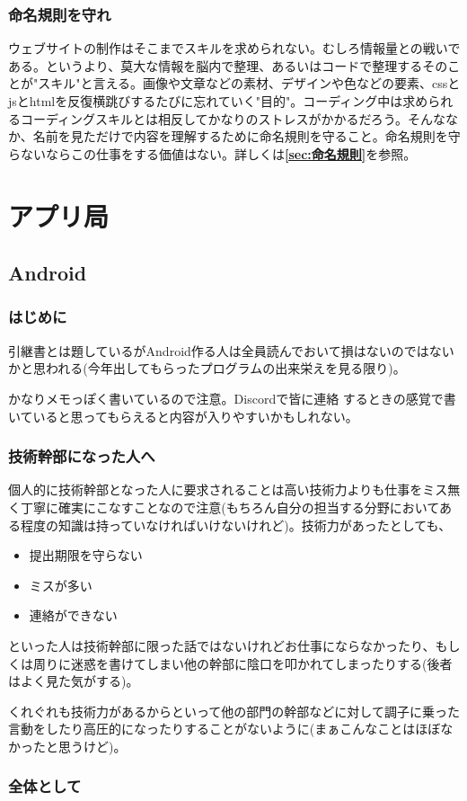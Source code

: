 \documentclass[a4paper]{ltjsreport}
\newcommand{\Chapter}[1]{\chapter{#1}\thispagestyle{fancy}}
\begin{document}
\subsection{命名規則を守れ}
ウェブサイトの制作はそこまでスキルを求められない。むしろ情報量との戦いである。というより、莫大な情報を脳内で整理、あるいはコードで整理するそのことが"スキル"と言える。画像や文章などの素材、デザインや色などの要素、cssとjsとhtmlを反復横跳びするたびに忘れていく"目的"。コーディング中は求められるコーディングスキルとは相反してかなりのストレスがかかるだろう。そんななか、名前を見ただけで内容を理解するために命名規則を守ること。命名規則を守らないならこの仕事をする価値はない。詳しくは{\bfseries\ref{sec:命名規則}}を参照。

\Chapter{アプリ局}
\section{Android}
\subsection{はじめに}
引継書とは題しているがAndroid作る人は全員読んでおいて損はないのではないかと思われる(今年出してもらったプログラムの出来栄えを見る限り)。\par
かなりメモっぽく書いているので注意。Discordで皆に連絡
するときの感覚で書いていると思ってもらえると内容が入りやすいかもしれない。
\subsection{技術幹部になった人へ}
個人的に技術幹部となった人に要求されることは高い技術力よりも仕事をミス無く丁寧に確実にこなすことなので注意(もちろん自分の担当する分野においてある程度の知識は持っていなければいけないけれど)。技術力があったとしても、
\begin{itemize}
  \item 提出期限を守らない
  \item ミスが多い
  \item 連絡ができない
\end{itemize}
といった人は技術幹部に限った話ではないけれどお仕事にならなかったり、もしくは周りに迷惑を書けてしまい他の幹部に陰口を叩かれてしまったりする(後者はよく見た気がする)。\par
くれぐれも技術力があるからといって他の部門の幹部などに対して調子に乗った言動をしたり高圧的になったりすることがないように(まぁこんなことはほぼなかったと思うけど)。
\subsection{全体として}
\end{document}
